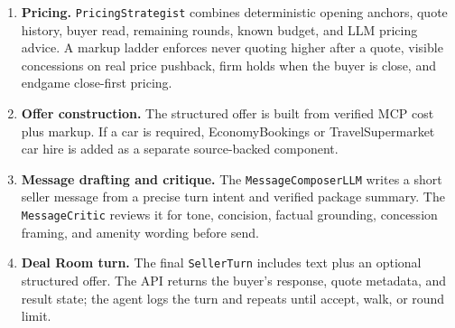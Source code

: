 \documentclass[10pt,a4paper]{article}
\begin{document}
\begin{enumerate}
  \item \textbf{Pricing.} \texttt{PricingStrategist} combines deterministic opening anchors, quote history, buyer read, remaining rounds, known budget, and LLM pricing advice. A markup ladder enforces never quoting higher after a quote, visible concessions on real price pushback, firm holds when the buyer is close, and endgame close-first pricing.
  \item \textbf{Offer construction.} The structured offer is built from verified MCP cost plus markup. If a car is required, EconomyBookings or TravelSupermarket car hire is added as a separate source-backed component.
  \item \textbf{Message drafting and critique.} The \texttt{MessageComposerLLM} writes a short seller message from a precise turn intent and verified package summary. The \texttt{MessageCritic} reviews it for tone, concision, factual grounding, concession framing, and amenity wording before send.
  \item \textbf{Deal Room turn.} The final \texttt{SellerTurn} includes text plus an optional structured offer. The API returns the buyer's response, quote metadata, and result state; the agent logs the turn and repeats until accept, walk, or round limit.
\end{enumerate}
\end{document}
